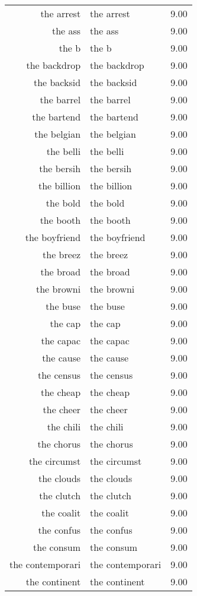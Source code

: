 \begin{table}[ht]
\begin{tabular}{rlr}
  the arrest & the arrest & 9.00 \\ 
  the ass & the ass & 9.00 \\ 
  the b & the b & 9.00 \\ 
  the backdrop & the backdrop & 9.00 \\ 
  the backsid & the backsid & 9.00 \\ 
  the barrel & the barrel & 9.00 \\ 
  the bartend & the bartend & 9.00 \\ 
  the belgian & the belgian & 9.00 \\ 
  the belli & the belli & 9.00 \\ 
  the bersih & the bersih & 9.00 \\ 
  the billion & the billion & 9.00 \\ 
  the bold & the bold & 9.00 \\ 
  the booth & the booth & 9.00 \\ 
  the boyfriend & the boyfriend & 9.00 \\ 
  the breez & the breez & 9.00 \\ 
  the broad & the broad & 9.00 \\ 
  the browni & the browni & 9.00 \\ 
  the buse & the buse & 9.00 \\ 
  the cap & the cap & 9.00 \\ 
  the capac & the capac & 9.00 \\ 
  the cause & the cause & 9.00 \\ 
  the census & the census & 9.00 \\ 
  the cheap & the cheap & 9.00 \\ 
  the cheer & the cheer & 9.00 \\ 
  the chili & the chili & 9.00 \\ 
  the chorus & the chorus & 9.00 \\ 
  the circumst & the circumst & 9.00 \\ 
  the clouds & the clouds & 9.00 \\ 
  the clutch & the clutch & 9.00 \\ 
  the coalit & the coalit & 9.00 \\ 
  the confus & the confus & 9.00 \\ 
  the consum & the consum & 9.00 \\ 
  the contemporari & the contemporari & 9.00 \\ 
  the continent & the continent & 9.00 \\ 

\end{tabular}
\end{table}
